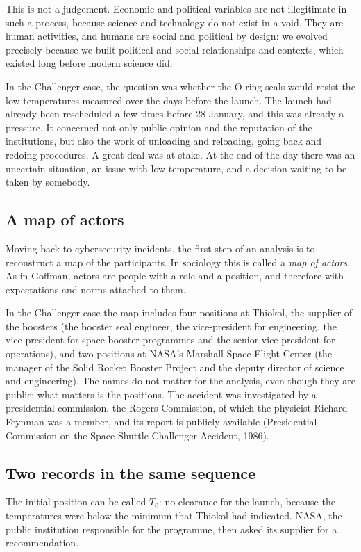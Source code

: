 This is not a judgement. Economic and political variables are not illegitimate in such a process, because science and technology do not exist in a void. They are human activities, and humans are social and political by design: we evolved precisely because we built political and social relationships and contexts, which existed long before modern science did.

In the Challenger case, the question was whether the O-ring seals would resist the low temperatures measured over the days before the launch. The launch had already been rescheduled a few times before 28 January, and this was already a pressure. It concerned not only public opinion and the reputation of the institutions, but also the work of unloading and reloading, going back and redoing procedures. A great deal was at stake. At the end of the day there was an uncertain situation, an issue with low temperature, and a decision waiting to be taken by somebody.

\subsection{A map of actors}
Moving back to cybersecurity incidents, the first step of an analysis is to reconstruct a map of the participants. In sociology this is called a \emph{map of actors}. As in Goffman, actors are people with a role and a position, and therefore with expectations and norms attached to them.

In the Challenger case the map includes four positions at Thiokol, the supplier of the boosters (the booster seal engineer, the vice-president for engineering, the vice-president for space booster programmes and the senior vice-president for operations), and two positions at NASA's Marshall Space Flight Center (the manager of the Solid Rocket Booster Project and the deputy director of science and engineering). The names do not matter for the analysis, even though they are public: what matters is the positions. The accident was investigated by a presidential commission, the Rogers Commission, of which the physicist Richard Feynman was a member, and its report is publicly available (Presidential Commission on the Space Shuttle Challenger Accident, 1986).

\subsection{Two records in the same sequence}
The initial position can be called $T_0$: no clearance for the launch, because the temperatures were below the minimum that Thiokol had indicated. NASA, the public institution responsible for the programme, then asked its supplier for a recommendation.

